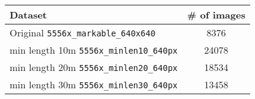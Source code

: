 \documentclass[border={15pt 1pt 5pt 1pt}, varwidth=38em]{standalone}
\begin{document}
\newcommand{\rpm}{\sbox0{$1$}\sbox2{$\scriptstyle\pm$}
  \raise\dimexpr(\ht0-\ht2)/2\relax\box2 }

\begin{table}[]
\centering
\begin{tabular}{l|c}
Dataset & \# of images \\ \hline
Original \verb!5556x_markable_640x640! & 8376 \\
min length 10m \verb!5556x_minlen10_640px! & 24078 \\
min length 20m \verb!5556x_minlen20_640px! & 18534 \\
min length 30m \verb!5556x_minlen30_640px! & 13458 \\
\end{tabular}
\end{table}
\end{document}
